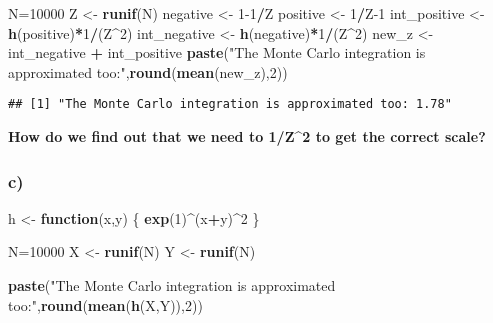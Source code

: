 \documentclass[
]{article}
\newenvironment{Shaded}{\begin{snugshade}}{\end{snugshade}}
\newcommand{\ControlFlowTok}[1]{\textcolor[rgb]{0.13,0.29,0.53}{\textbf{#1}}}
\newcommand{\DecValTok}[1]{\textcolor[rgb]{0.00,0.00,0.81}{#1}}
\newcommand{\FunctionTok}[1]{\textcolor[rgb]{0.13,0.29,0.53}{\textbf{#1}}}
\newcommand{\NormalTok}[1]{#1}
\newcommand{\OtherTok}[1]{\textcolor[rgb]{0.56,0.35,0.01}{#1}}
\newcommand{\SpecialCharTok}[1]{\textcolor[rgb]{0.81,0.36,0.00}{\textbf{#1}}}
\newcommand{\StringTok}[1]{\textcolor[rgb]{0.31,0.60,0.02}{#1}}
\begin{document}
\begin{Shaded}
\begin{Highlighting}[]
\NormalTok{N}\OtherTok{=}\DecValTok{10000}
\NormalTok{Z }\OtherTok{\textless{}{-}} \FunctionTok{runif}\NormalTok{(N)}
\NormalTok{negative }\OtherTok{\textless{}{-}}  \DecValTok{1{-}1}\SpecialCharTok{/}\NormalTok{Z}
\NormalTok{positive }\OtherTok{\textless{}{-}}  \DecValTok{1}\SpecialCharTok{/}\NormalTok{Z}\DecValTok{{-}1}
\NormalTok{int\_positive }\OtherTok{\textless{}{-}} \FunctionTok{h}\NormalTok{(positive)}\SpecialCharTok{*}\DecValTok{1}\SpecialCharTok{/}\NormalTok{(Z}\SpecialCharTok{\^{}}\DecValTok{2}\NormalTok{)}
\NormalTok{int\_negative }\OtherTok{\textless{}{-}} \FunctionTok{h}\NormalTok{(negative)}\SpecialCharTok{*}\DecValTok{1}\SpecialCharTok{/}\NormalTok{(Z}\SpecialCharTok{\^{}}\DecValTok{2}\NormalTok{)}
\NormalTok{new\_z }\OtherTok{\textless{}{-}}\NormalTok{ int\_negative }\SpecialCharTok{+}\NormalTok{ int\_positive}
\FunctionTok{paste}\NormalTok{(}\StringTok{"The Monte Carlo integration is approximated too:"}\NormalTok{,}\FunctionTok{round}\NormalTok{(}\FunctionTok{mean}\NormalTok{(new\_z),}\DecValTok{2}\NormalTok{))}
\end{Highlighting}
\end{Shaded}

\begin{verbatim}
## [1] "The Monte Carlo integration is approximated too: 1.78"
\end{verbatim}

\textbf{How do we find out that we need to 1/Z\^{}2 to get the correct
scale?}

\hypertarget{c-1}{%
\subsubsection{c)}\label{c-1}}

\begin{Shaded}
\begin{Highlighting}[]
\NormalTok{h }\OtherTok{\textless{}{-}} \ControlFlowTok{function}\NormalTok{(x,y) \{}
    \FunctionTok{exp}\NormalTok{(}\DecValTok{1}\NormalTok{)}\SpecialCharTok{\^{}}\NormalTok{(x}\SpecialCharTok{+}\NormalTok{y)}\SpecialCharTok{\^{}}\DecValTok{2}
\NormalTok{\}}
\end{Highlighting}
\end{Shaded}

\begin{Shaded}
\begin{Highlighting}[]
\NormalTok{N}\OtherTok{=}\DecValTok{10000}
\NormalTok{X }\OtherTok{\textless{}{-}} \FunctionTok{runif}\NormalTok{(N)}
\NormalTok{Y }\OtherTok{\textless{}{-}} \FunctionTok{runif}\NormalTok{(N)}

\FunctionTok{paste}\NormalTok{(}\StringTok{"The Monte Carlo integration is approximated too:"}\NormalTok{,}\FunctionTok{round}\NormalTok{(}\FunctionTok{mean}\NormalTok{(}\FunctionTok{h}\NormalTok{(X,Y)),}\DecValTok{2}\NormalTok{))}
\end{Highlighting}
\end{Shaded}
\end{document}
